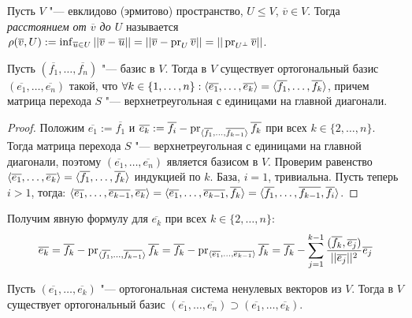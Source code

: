\begin{definition}
	Пусть $V$ "--- евклидово (эрмитово) пространство, $U \le V$, $\overline{v} \in V$. Тогда \textit{расстоянием от $\overline{v}$ до $U$} называется $\rho(\overline{v}, U) \hm{:=} \inf_{\overline{u} \in U}||\overline{v} - \overline{u}|| = ||\overline{v} - \pr_U{\overline{v}}|| = ||\pr_{U^\perp}\overline{v}||$. 
\end{definition}

\begin{theorem}
	Пусть $(\overline{f_1}, \dots, \overline{f_n})$ "--- базис в $V$. Тогда в $V$ существует ортогональный базис $(\overline{e_1}, \dots, \overline{e_n})$ такой, что $\forall k \hm{\in} \{1, \dots, n\}: \langle\overline{e_1}, \dots, \overline{e_k}\rangle \hm= \langle\overline{f_1}, \dots, \overline{f_k}\rangle$, причем матрица перехода $S$ "--- верхнетреугольная с единицами на главной диагонали.
\end{theorem}

\begin{proof}
	Положим $\overline{e_1} := \overline{f_1}$ и $\overline{e_k} := \overline{f_i} \hm{-} \pr_{\langle\overline{f_1}, \dots, \overline{f_{k - 1}}\rangle}\overline{f_k}$ при всех $k \in \{2, \dots, n\}$. Тогда матрица перехода $S$ "--- верхнетреугольная с единицами на главной диагонали, поэтому $(\overline{e_1}, \dotsc, \overline{e_n})$ является базисом в $V$. Проверим равенство $\langle\overline{e_1}, \dots, \overline{e_k}\rangle \hm= \langle\overline{f_1}, \dots, \overline{f_k}\rangle$ индукцией по $k$. База, $i = 1$, тривиальна. Пусть теперь $i > 1$, тогда: $\langle\overline{e_1}, \dots, \overline{e_{k-1}}, \overline{e_k}\rangle \hm= \langle\overline{e_1}, \dots, \overline{e_{k-1}}, \overline{f_k}\rangle = \langle\overline{f_1}, \dots, \overline{f_{k-1}}, \overline{f_i}\rangle$.
\end{proof}

\begin{note}
	Получим явную формулу для $\overline{e_k}$ при всех $k \in \{2, \dots, n\}$:
	\[\overline{e_k} = \overline{f_k} - \operatorname{pr}_{\langle\overline{f_1}, \dots, \overline{f_{k - 1}}\rangle}{\overline{f_k}} = \overline{f_k} - \operatorname{pr}_{\langle\overline{e_1}, \dots, \overline{e_{k - 1}}\rangle}{\overline{f_k}} = \overline{f_k} - \sum_{j = 1}^{k - 1}\frac{(\overline{f_k}, \overline{e_j})}{||\overline{e_j}||^2}\overline{e_j}\]
\end{note}

\begin{corollary}
	Пусть $(\overline{e_1}, \dots, \overline{e_k})$ "--- ортогональная система ненулевых векторов из $V$. Тогда в $V$ существует ортогональный базис $(\overline{e_1}, \dots, \overline{e_n}) \supset (\overline{e_1}, \dots, \overline{e_k})$.
\end{corollary}

